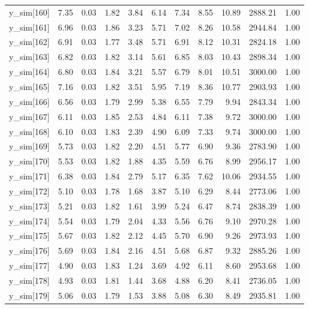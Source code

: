 \begin{table}[ht]
\begin{tabular}{rrrrrrrrrrr}
  y\_sim[160] & 7.35 & 0.03 & 1.82 & 3.84 & 6.14 & 7.34 & 8.55 & 10.89 & 2888.21 & 1.00 \\ 
  y\_sim[161] & 6.96 & 0.03 & 1.86 & 3.23 & 5.71 & 7.02 & 8.26 & 10.58 & 2944.84 & 1.00 \\ 
  y\_sim[162] & 6.91 & 0.03 & 1.77 & 3.48 & 5.71 & 6.91 & 8.12 & 10.31 & 2824.18 & 1.00 \\ 
  y\_sim[163] & 6.82 & 0.03 & 1.82 & 3.14 & 5.61 & 6.85 & 8.03 & 10.43 & 2898.34 & 1.00 \\ 
  y\_sim[164] & 6.80 & 0.03 & 1.84 & 3.21 & 5.57 & 6.79 & 8.01 & 10.51 & 3000.00 & 1.00 \\ 
  y\_sim[165] & 7.16 & 0.03 & 1.82 & 3.51 & 5.95 & 7.19 & 8.36 & 10.77 & 2903.93 & 1.00 \\ 
  y\_sim[166] & 6.56 & 0.03 & 1.79 & 2.99 & 5.38 & 6.55 & 7.79 & 9.94 & 2843.34 & 1.00 \\ 
  y\_sim[167] & 6.11 & 0.03 & 1.85 & 2.53 & 4.84 & 6.11 & 7.38 & 9.72 & 3000.00 & 1.00 \\ 
  y\_sim[168] & 6.10 & 0.03 & 1.83 & 2.39 & 4.90 & 6.09 & 7.33 & 9.74 & 3000.00 & 1.00 \\ 
  y\_sim[169] & 5.73 & 0.03 & 1.82 & 2.20 & 4.51 & 5.77 & 6.90 & 9.36 & 2783.90 & 1.00 \\ 
  y\_sim[170] & 5.53 & 0.03 & 1.82 & 1.88 & 4.35 & 5.59 & 6.76 & 8.99 & 2956.17 & 1.00 \\ 
  y\_sim[171] & 6.38 & 0.03 & 1.84 & 2.79 & 5.17 & 6.35 & 7.62 & 10.06 & 2934.55 & 1.00 \\ 
  y\_sim[172] & 5.10 & 0.03 & 1.78 & 1.68 & 3.87 & 5.10 & 6.29 & 8.44 & 2773.06 & 1.00 \\ 
  y\_sim[173] & 5.21 & 0.03 & 1.82 & 1.61 & 3.99 & 5.24 & 6.47 & 8.74 & 2838.39 & 1.00 \\ 
  y\_sim[174] & 5.54 & 0.03 & 1.79 & 2.04 & 4.33 & 5.56 & 6.76 & 9.10 & 2970.28 & 1.00 \\ 
  y\_sim[175] & 5.67 & 0.03 & 1.82 & 2.12 & 4.45 & 5.70 & 6.90 & 9.26 & 2973.93 & 1.00 \\ 
  y\_sim[176] & 5.69 & 0.03 & 1.84 & 2.16 & 4.51 & 5.68 & 6.87 & 9.32 & 2885.26 & 1.00 \\ 
  y\_sim[177] & 4.90 & 0.03 & 1.83 & 1.24 & 3.69 & 4.92 & 6.11 & 8.60 & 2953.68 & 1.00 \\ 
  y\_sim[178] & 4.93 & 0.03 & 1.81 & 1.44 & 3.68 & 4.88 & 6.20 & 8.41 & 2736.05 & 1.00 \\ 
  y\_sim[179] & 5.06 & 0.03 & 1.79 & 1.53 & 3.88 & 5.08 & 6.30 & 8.49 & 2935.81 & 1.00 \\ 

\end{tabular}
\end{table}
